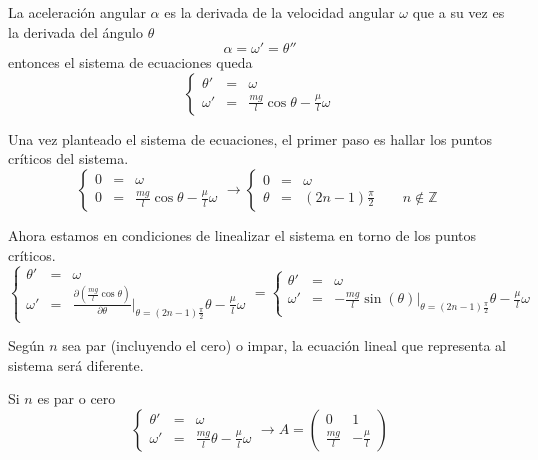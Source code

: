 La aceleración angular $\alpha$ es la derivada de la velocidad angular $\omega$ que a su vez es la derivada del ángulo $\theta$
%
\begin{equation}
\alpha = \omega' = \theta'' \nonumber
\end{equation}
%
entonces el sistema de ecuaciones queda
%
\begin{equation}
\left \{
\begin{array}{rcl}
\theta' &=& \omega\\
\omega' &=& \frac{mg}{l}\cos{\theta}-\frac{\mu}{l}\omega
\end{array}
\right. \nonumber
\end{equation}

Una vez planteado el sistema de ecuaciones, el primer paso es hallar los puntos críticos del sistema.
%
\begin{equation}
\left \{
\begin{array}{rcl}
0 &=& \omega\\
0 &=& \frac{mg}{l}\cos{\theta}-\frac{\mu}{l}\omega
\end{array}
\right.
\longrightarrow
\left \{
\begin{array}{rcl}
0 &=& \omega\\
\theta &=& (2n-1)\frac{\pi}{2} \qquad n\notin\mathbb{Z}
\end{array}
\right.
\nonumber
\end{equation}

Ahora estamos en condiciones de linealizar el sistema en torno de los puntos críticos.
% 
\begin{equation}
\left \{
\begin{array}{rcl}
\theta' &=& \omega\\
\omega' &=& \frac{\partial \left(\frac{mg}{l}\cos{\theta}\right)}{\partial\theta}\Big|_{\theta = (2n-1)\frac{\pi}{2}}\theta-\frac{\mu}{l}\omega
\end{array}
\right.
=
\left \{
\begin{array}{rcl}
\theta' &=& \omega\\
\omega' &=& -\frac{mg}{l}\sin(\theta)\Big|_{\theta = (2n-1)\frac{\pi}{2}}\theta-\frac{\mu}{l}\omega
\end{array}
\right.
\nonumber
\end{equation}

Según $n$ sea par (incluyendo el cero) o impar, la ecuación lineal que representa al sistema será diferente.

Si $n$ es par o cero
%
\begin{equation}
\left \{
\begin{array}{rcl}
\theta' &=& \omega\\
\omega' &=& \frac{mg}{l}\theta-\frac{\mu}{l}\omega
\end{array}
\right.
\longrightarrow
A=
\begin{pmatrix}
0 &1 \\
\frac{mg}{l} &-\frac{\mu}{l}
\end{pmatrix}
\nonumber
\end{equation}

